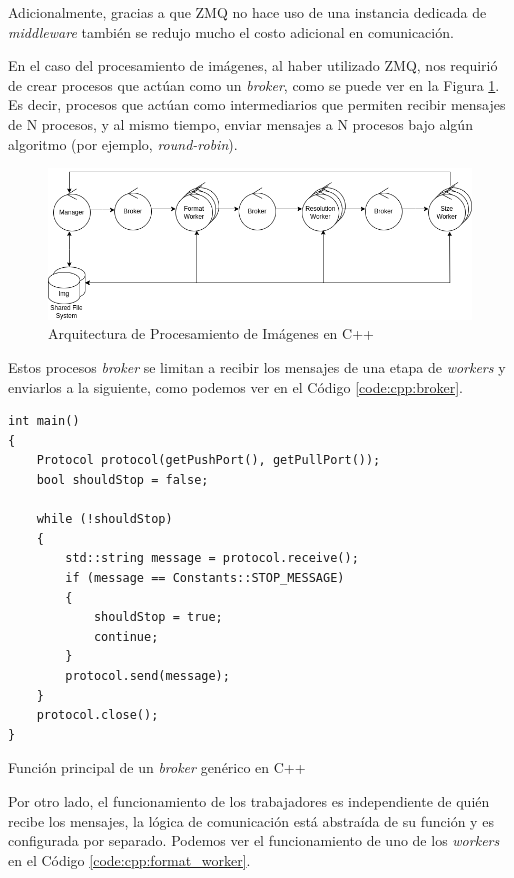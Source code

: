 \documentclass[11pt]{article}
\begin{document}
Adicionalmente, gracias a que ZMQ no hace uso de una instancia dedicada de \textit{middleware} también se redujo mucho el costo adicional en comunicación.

En el caso del procesamiento de imágenes, al haber utilizado ZMQ, nos requirió de crear procesos que actúan como un \textit{broker}, como se puede ver en la Figura \ref{fig:cpp:image_processing_arch}. Es decir, procesos que actúan como intermediarios que permiten recibir mensajes de N procesos, y al mismo tiempo, enviar mensajes a N procesos bajo algún algoritmo (por ejemplo, \textit{round-robin}).

\begin{figure}[ht]
    \centering
    \includegraphics[scale=0.4]{resources/distributed_systems/cpp/image_processing_arch.png}
    \caption{Arquitectura de Procesamiento de Imágenes en C++}
    \label{fig:cpp:image_processing_arch}
\end{figure}

Estos procesos \textit{broker} se limitan a recibir los mensajes de una etapa de \textit{workers} y enviarlos a la siguiente, como podemos ver en el Código \ref{code:cpp:broker}.

\begin{listing}[ht]
\begin{verbatim}
int main()
{
    Protocol protocol(getPushPort(), getPullPort());
    bool shouldStop = false;

    while (!shouldStop)
    {
        std::string message = protocol.receive();
        if (message == Constants::STOP_MESSAGE)
        {
            shouldStop = true;
            continue;
        }
        protocol.send(message);
    }
    protocol.close();
}
\end{verbatim}
\caption{Función principal de un \textit{broker} genérico en C++}
\label{code:cpp:broker}
\end{listing}

Por otro lado, el funcionamiento de los trabajadores es independiente de quién recibe los mensajes, la lógica de comunicación está abstraída de su función y es configurada por separado. Podemos ver el funcionamiento de uno de los \textit{workers} en el Código \ref{code:cpp:format_worker}.
\end{document}
